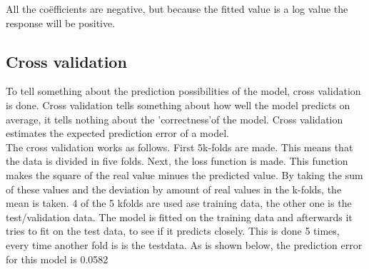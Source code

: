 \documentclass[11pt,]{article}
\begin{document}
All the coëfficients are negative, but because the fitted value is a log
value the response will be positive.

\subsection{Cross validation}\label{cross-validation}

To tell something about the prediction possibilities of the model, cross
validation is done. Cross validation tells something about how well the
model predicts on average, it tells nothing about the 'correctness'of
the model. Cross validation estimates the expected prediction error of a
model.\\
The cross validation works as follows. First 5k-folds are made. This
means that the data is divided in five folds. Next, the loss function is
made. This function makes the square of the real value minues the
predicted value. By taking the sum of these values and the deviation by
amount of real values in the k-folds, the mean is taken. 4 of the 5
kfolds are used ase training data, the other one is the test/validation
data. The model is fitted on the training data and afterwards it tries
to fit on the test data, to see if it predicts closely. This is done 5
times, every time another fold is is the testdata. As is shown below,
the prediction error for this model is 0.0582
\end{document}
